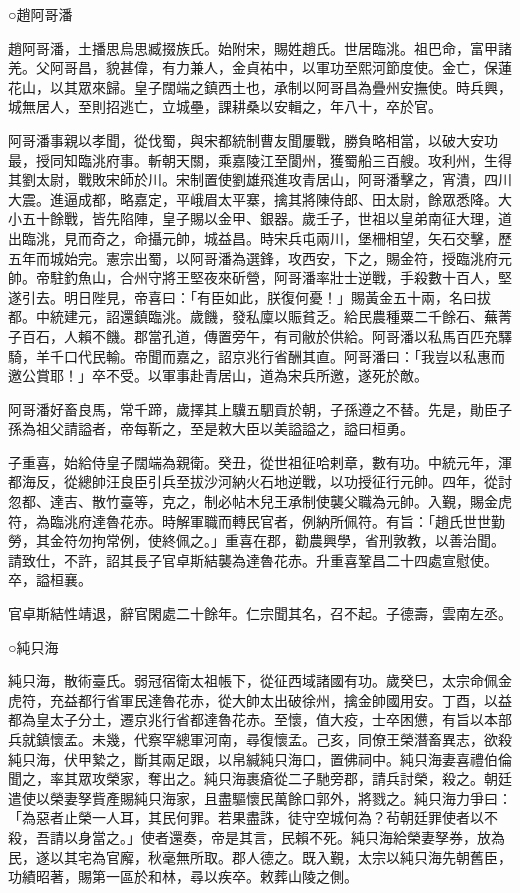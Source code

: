 \begin{pinyinscope}
 ○趙阿哥潘



 趙阿哥潘，土播思烏思臧掇族氏。始附宋，賜姓趙氏。世居臨洮。祖巴命，富甲諸羌。父阿哥昌，貌甚偉，有力兼人，金貞祐中，以軍功至熙河節度使。金亡，保蓮花山，以其眾來歸。皇子闊端之鎮西土也，承制以阿哥昌為疊州安撫使。時兵興，城無居人，至則招逃亡，立城壘，課耕桑以安輯之，年八十，卒於官。



 阿哥潘事親以孝聞，從伐蜀，與宋都統制曹友聞屢戰，勝負略相當，以破大安功最，授同知臨洮府事。斬朝天關，乘嘉陵江至閬州，獲蜀船三百艘。攻利州，生得其劉太尉，戰敗宋師於川。宋制置使劉雄飛進攻青居山，阿哥潘擊之，宵潰，四川大震。進逼成都，略嘉定，平峨眉太平寨，擒其將陳侍郎、田太尉，餘眾悉降。大小五十餘戰，皆先陷陣，皇子賜以金甲、銀器。歲壬子，世祖以皇弟南征大理，道出臨洮，見而奇之，命攝元帥，城益昌。時宋兵屯兩川，堡柵相望，矢石交擊，歷五年而城始完。憲宗出蜀，以阿哥潘為選鋒，攻西安，下之，賜金符，授臨洮府元帥。帝駐釣魚山，合州守將王堅夜來斫營，阿哥潘率壯士逆戰，手殺數十百人，堅遂引去。明日陛見，帝喜曰：「有臣如此，朕復何憂！」賜黃金五十兩，名曰拔都。中統建元，詔還鎮臨洮。歲饑，發私廩以賑貧乏。給民農種粟二千餘石、蕪菁子百石，人賴不饑。郡當孔道，傳置旁午，有司敝於供給。阿哥潘以私馬百匹充驛騎，羊千口代民輸。帝聞而嘉之，詔京兆行省酬其直。阿哥潘曰：「我豈以私惠而邀公賞耶！」卒不受。以軍事赴青居山，道為宋兵所邀，遂死於敵。



 阿哥潘好畜良馬，常千蹄，歲擇其上驥五駟貢於朝，子孫遵之不替。先是，勛臣子孫為祖父請謚者，帝每靳之，至是敕大臣以美謚謚之，謚曰桓勇。



 子重喜，始給侍皇子闊端為親衛。癸丑，從世祖征哈剌章，數有功。中統元年，渾都海反，從總帥汪良臣引兵至拔沙河納火石地逆戰，以功授征行元帥。四年，從討忽都、達吉、散竹臺等，克之，制必帖木兒王承制使襲父職為元帥。入覲，賜金虎符，為臨洮府達魯花赤。時解軍職而轉民官者，例納所佩符。有旨：「趙氏世世勤勞，其金符勿拘常例，使終佩之。」重喜在郡，勸農興學，省刑敦教，以善治聞。請致仕，不許，詔其長子官卓斯結襲為達魯花赤。升重喜鞏昌二十四處宣慰使。卒，謚桓襄。



 官卓斯結性靖退，辭官閑處二十餘年。仁宗聞其名，召不起。子德壽，雲南左丞。



 ○純只海



 純只海，散術臺氏。弱冠宿衛太祖帳下，從征西域諸國有功。歲癸巳，太宗命佩金虎符，充益都行省軍民達魯花赤，從大帥太出破徐州，擒金帥國用安。丁酉，以益都為皇太子分土，遷京兆行省都達魯花赤。至懷，值大疫，士卒困憊，有旨以本部兵就鎮懷孟。未幾，代察罕總軍河南，尋復懷孟。己亥，同僚王榮潛畜異志，欲殺純只海，伏甲縶之，斷其兩足跟，以帛緘純只海口，置佛祠中。純只海妻喜禮伯倫聞之，率其眾攻榮家，奪出之。純只海裹瘡從二子馳旁郡，請兵討榮，殺之。朝廷遣使以榮妻孥貲產賜純只海家，且盡驅懷民萬餘口郭外，將戮之。純只海力爭曰：「為惡者止榮一人耳，其民何罪。若果盡誅，徒守空城何為？茍朝廷罪使者以不殺，吾請以身當之。」使者還奏，帝是其言，民賴不死。純只海給榮妻孥券，放為民，遂以其宅為官廨，秋毫無所取。郡人德之。既入覲，太宗以純只海先朝舊臣，功績昭著，賜第一區於和林，尋以疾卒。敕葬山陵之側。




\end{pinyinscope}
